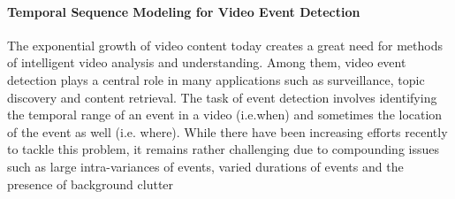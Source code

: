 \paragraph{Temporal Sequence Modeling for Video Event Detection} 
The exponential growth of video content today creates a great need for methods of intelligent video analysis and understanding. Among them, video event detection plays a central role in many applications such as surveillance, topic discovery and content retrieval.   The task  of event detection involves identifying the temporal range of an event in a video (i.e.when) and sometimes the location of the event as well (i.e. where).  While there have been increasing efforts recently to tackle this problem, it remains rather challenging due to compounding issues such as large intra-variances of  events,  varied  durations of  events  and  the  presence  of background clutter